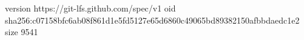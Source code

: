 version https://git-lfs.github.com/spec/v1
oid sha256:c07158bfc6ab08f861d1e5fd5127e65d6860c49065bd89382150afbbdaedc1e2
size 9541
